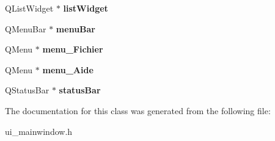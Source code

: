 \begin{DoxyCompactItemize}
\item 
\hypertarget{classUi__MainWindow_ae647a15635ba8a0e5d5aec475db99d8f}{Q\-List\-Widget $\ast$ {\bfseries list\-Widget}}\label{classUi__MainWindow_ae647a15635ba8a0e5d5aec475db99d8f}

\item 
\hypertarget{classUi__MainWindow_a2be1c24ec9adfca18e1dcc951931457f}{Q\-Menu\-Bar $\ast$ {\bfseries menu\-Bar}}\label{classUi__MainWindow_a2be1c24ec9adfca18e1dcc951931457f}

\item 
\hypertarget{classUi__MainWindow_a073cce6e21486d944090502ae6949476}{Q\-Menu $\ast$ {\bfseries menu\-\_\-\-Fichier}}\label{classUi__MainWindow_a073cce6e21486d944090502ae6949476}

\item 
\hypertarget{classUi__MainWindow_a7636ad8f82f2e9113d3139a059d4b306}{Q\-Menu $\ast$ {\bfseries menu\-\_\-\-Aide}}\label{classUi__MainWindow_a7636ad8f82f2e9113d3139a059d4b306}

\item 
\hypertarget{classUi__MainWindow_a50fa481337604bcc8bf68de18ab16ecd}{Q\-Status\-Bar $\ast$ {\bfseries status\-Bar}}\label{classUi__MainWindow_a50fa481337604bcc8bf68de18ab16ecd}

\end{DoxyCompactItemize}


The documentation for this class was generated from the following file\-:\begin{DoxyCompactItemize}
\item 
ui\-\_\-mainwindow.\-h\end{DoxyCompactItemize}
